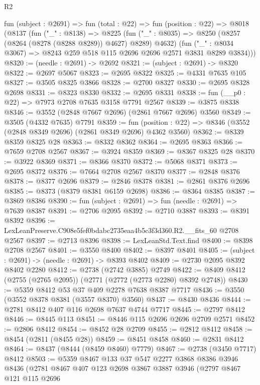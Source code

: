 \begin{lexlean}{R2}
\begin{coremodule}
  fun (subject : @2691) =>
  fun (total : @22) =>
  fun (position : @22) =>
  @8018
    (@8137
      (fun ("_" : @8138) =>
      @8225
        (fun ("_" : @8035) => @8250 (@8257 (@8264 (@8278 (@8288 @8289)) @4627) @8289) @4632)
        (fun ("_" : @8034 @3067) => @8243 @259 @518 @115 @2696 @2696 @2571 @3831 @8289 @3834)))
@8320 := (needle : @2691) -> @2692
@8321 := (subject : @2691) -> @8320
@8322 := @2697 @5067
@8323 := @2695 @8322
@8325 := @4331 @7635 @105
@8327 := @3505 @8325 @3866
@8328 := @2700 @8327
@8330 := @2695 @8328 @2698
@8331 := @8323 @8330
@8332 := @2695 @8331
@8338 := fun (__p0 : @22) => @7973 @2708 @7635 @3158 @7791 @2567
@8339 := @3875 @8338
@8346 := @3552 (@2848 @7667 @2696) (@2861 @7667 @2696) @3560
@8349 := @3505 (@4332 @7635) @7791
@8359 := fun (position : @22) => @8346 (@3552 (@2848 @8349 @2696) (@2861 @8349 @2696) @4362 @3560)
@8362 := @8339 @8359 @8325 @28
@8363 := @8332 @8362
@8364 := @2695 @8363
@8366 := @7659 @2708 @2567
@8367 := @3924 @8359
@8369 := @8367 @8325 @28
@8370 := @3922 @8369
@8371 := @8366 @8370
@8372 := @5068 @8371
@8373 := @2695 @8372
@8376 := @7664 @2708 @2567 @8370
@8377 := @2848 @8376
@8378 := @8377 @2696
@8379 := @2846 @8378
@8381 := @2861 @8376 @2696
@8385 := @8373 (@8379 @8381 @6159 @2698)
@8386 := @8364 @8385
@8387 := @3869 @8386
@8390 := fun (subject : @2691) => fun (needle : @2691) => @7639 @8387
@8391 := @2706 @2095
@8392 := @2710 @3887
@8393 := @8391 @8392
@8396 := LexLeanPreserve.C908e5fef0bdabc2735eaa4b5c3f3d360.R2.__fits_60 @2708 @2567
@8397 := @2713 @8396
@8398 := LexLeanStd.Text.find
@8400 := @8398 @2708 @2567
@8401 := @3550 @8400
@8402 := @8397 @8401
@8405 := (subject : @2691) -> (needle : @2691) -> @8393 @8402
@8409 := @2730 @2095 @8392 @8402 @2280
@8412 := @2738 (@2742 @3885) @2749
@8422 := @8409 @8412 (@2755 (@2765 @2095)) (@2771 (@2772 (@2773 @2280) @8392 @2748))
@8430 := @5359 @8412 @53 @37 @409 @2278 @7638 @8387 @7717
@8436 := @3550 (@3552 @8378 @8381 (@3557 @8370) @3560)
@8437 := @8430 @8436
@8444 := @2781 @8412 @407 @116 @2698 @7637 @4744 @7717
@8445 := @2797 @8412
@8446 := @8445 @113
@8451 := @8446 @115 @2696 @2696 @2709 @2571
@8452 := @2806 @8412
@8454 := @8452 @28 @2709
@8455 := @2812 @8412
@8458 := @8454 (@2811 (@8455 @28))
@8459 := @8451 @8458
@8460 := @2831 @8412
@8464 := @8437 (@8444 (@8459 @8460) @7779)
@8467 := @2738 (@3450 @7717) @8412
@8503 := @5359
    @8467
    @133
    @37
    @547
    @2277
    @3868
    @8386
    @3946
    @8436
    (@2781
      @8467
      @407
      @123
      @2698
      @3867
      @3887
      @3946
      (@2797
        @8467
        @121
        @115
        @2696

\end{coremodule}
\end{lexlean}
